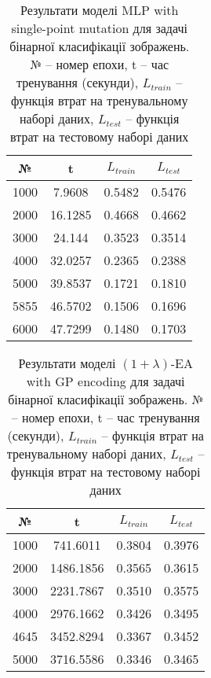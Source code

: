 \begin{table}[ht]
	\centering
	\begin{adjustbox}{max width=\textwidth}
		\begin{tabular}{|c|c|c|c|}
			\hline 
			№ & t & $L_{train}$ & $L_{test}$ \\
			\hline 
			1000 & 7.9608 & 0.5482 & 0.5476 \\
			\hline 
			2000 & 16.1285 & 0.4668 & 0.4662 \\
			\hline
			3000 & 24.144 & 0.3523 & 0.3514 \\
			\hline
			4000 & 32.0257 & 0.2365 & 0.2388 \\
			\hline
			5000 & 39.8537 & 0.1721 & 0.1810 \\
			\hline
			5855 & 46.5702 & 0.1506 & 0.1696 \\
			\hline
			6000 & 47.7299 & 0.1480 & 0.1703 \\
			\hline
		\end{tabular}
	\end{adjustbox}
	\caption{Результати моделі MLP with single-point mutation для задачі бінарної класифікації зображень. № -- номер епохи, t -- час тренування (секунди), $L_{train}$ -- функція втрат на тренувальному наборі даних, $L_{test}$ -- функція втрат на тестовому наборі даних}
	\label{mlp_spm_bc_id_results}
\end{table}

\begin{table}[ht]
	\centering
	\begin{adjustbox}{max width=\textwidth}
		\begin{tabular}{|c|c|c|c|}
			\hline 
			№ & t & $L_{train}$ & $L_{test}$ \\
			\hline 
			1000 & 741.6011 & 0.3804 & 0.3976 \\
			\hline 
			2000 & 1486.1856 & 0.3565 & 0.3615 \\
			\hline
			3000 & 2231.7867 & 0.3510 & 0.3575 \\
			\hline
			4000 & 2976.1662 & 0.3426 & 0.3495 \\
			\hline
			4645 & 3452.8294 & 0.3367 & 0.3452 \\
			\hline
			5000 & 3716.5586 & 0.3346 & 0.3465 \\
			\hline
		\end{tabular}
	\end{adjustbox}
	\caption{Результати моделі $(1+\lambda)$-EA with GP encoding для задачі бінарної класифікації зображень. № -- номер епохи, t -- час тренування (секунди), $L_{train}$ -- функція втрат на тренувальному наборі даних, $L_{test}$ -- функція втрат на тестовому наборі даних}
	\label{ea_bc_id_results}
\end{table}

